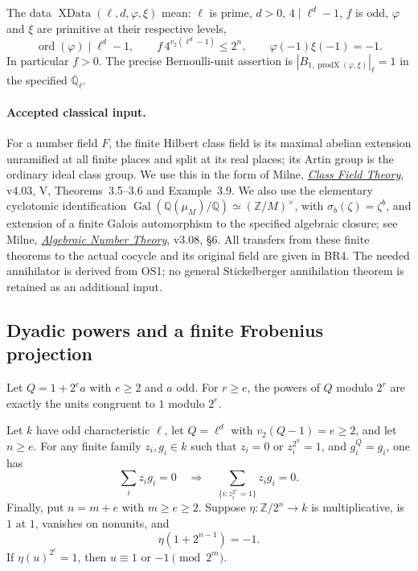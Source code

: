 The data $\operatorname{XData}(\ell,d,\varphi,\xi)$ mean:
$\ell$ is prime, $d>0$, $4\mid\ell^d-1$, $f$ is odd,
$\varphi$ and $\xi$ are primitive at their respective levels,
\[
 \operatorname{ord}(\varphi)\mid\ell^d-1,\qquad
 f\,4^{v_2(\ell^d-1)}\le2^n,\qquad
 \varphi(-1)\xi(-1)=-1.
 \tag{BR.5}
\]
In particular $f>0$.  The precise Bernoulli-unit assertion is
$|B_{1,\operatorname{prodX}(\varphi,\xi)}|_\ell=1$ in the specified
$\overline{\mathbb Q}_\ell$.

\paragraph{Accepted classical input.}
For a number field $F$, the finite Hilbert class field is its maximal
abelian extension unramified at all finite places and split at its
real places; its Artin group is the ordinary ideal class group.
We use this in the form of Milne,
\href{https://www.jmilne.org/math/CourseNotes/CFT.pdf}{\emph{Class
Field Theory}}, v4.03, V, Theorems~3.5--3.6 and Example~3.9.
We also use the elementary cyclotomic identification
$\operatorname{Gal}(\mathbb Q(\mu_M)/\mathbb Q)
\simeq(\mathbb Z/M)^\times$, with $\sigma_b(\zeta)=\zeta^b$,
and extension of a finite Galois automorphism to the specified
algebraic closure; see Milne,
\href{https://www.jmilne.org/math/CourseNotes/ANT.pdf}{\emph{Algebraic
Number Theory}}, v3.08, \S6.
All transfers from these finite theorems to the actual cocycle and its
original field are given in BR4.  The needed annihilator is derived
from OS1; no general Stickelberger annihilation theorem is retained
as an additional input.

\subsection{Dyadic powers and a finite Frobenius projection}

\begin{proposition}
\label{prop:br-dyadic}
Let $Q=1+2^e a$ with $e\ge2$ and $a$ odd.  For $r\ge e$, the
powers of $Q$ modulo $2^r$ are exactly the units congruent to $1$
modulo $2^e$.

Let $k$ have odd characteristic $\ell$, let $Q=\ell^d$ with
$v_2(Q-1)=e\ge2$, and let $n\ge e$.  For any finite family
$z_i,g_i\in k$ such that
$z_i=0$ or $z_i^{2^n}=1$, and $g_i^Q=g_i$, one has
\[
 \sum_i z_i g_i=0
 \quad\Longrightarrow\quad
 \sum_{\{i:z_i^{2^e}=1\}}z_i g_i=0.
 \tag{BR.6}
\]
Finally, put $n=m+e$ with $m\ge e\ge2$.  Suppose
$\eta:\mathbb Z/2^n\to k$ is multiplicative, is $1$ at $1$,
vanishes on nonunits, and
\[
                    \eta(1+2^{n-1})=-1.
                    \tag{BR.7}
\]
If $\eta(u)^{2^e}=1$, then
$u\equiv1$ or $-1\pmod{2^m}$.
\end{proposition}

